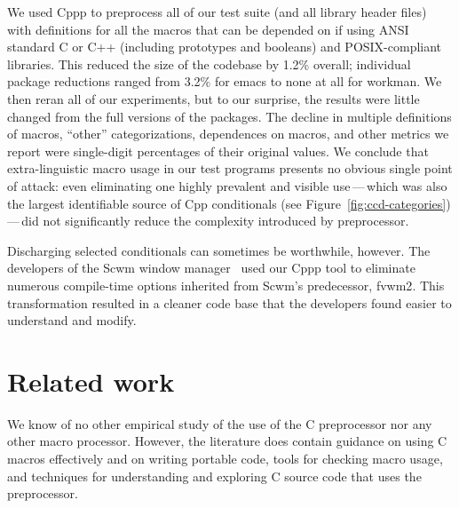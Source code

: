 \documentclass[10pt]{article}
\newcommand{\comment}[1]{\textbf{[[#1]]}}
\newcommand{\pkg}[1]{\textsf{#1}}
\begin{document}



We used Cppp to preprocess all of our test suite (and all library header
files) with definitions for all the macros that can be depended on if using
ANSI standard C or C++ (including prototypes and booleans) and
POSIX-compliant libraries.  This reduced the size of the codebase by 1.2\%
overall; individual package reductions ranged from 3.2\% for \pkg{emacs} to
none at all for \pkg{workman}.  We then reran all of our experiments, but
to our surprise, the results were little changed from the full versions of
the packages.  The decline in multiple definitions of macros, ``other''
categorizations, dependences on macros, and other metrics we report were
single-digit percentages of their original values.  We conclude that
extra-linguistic macro usage in our test programs presents no obvious
single point of attack:  even eliminating one highly prevalent and visible
use\,---\,which was also the largest identifiable source of Cpp
conditionals (see Figure~\ref{fig:ccd-categories})\,---\,did not
significantly reduce the complexity introduced by preprocessor.

Discharging selected conditionals can sometimes be worthwhile, however.
The developers of the \pkg{Scwm} window manager~\cite{Scwm} used our Cppp tool to eliminate
numerous compile-time options inherited from \pkg{Scwm}'s predecessor,
\pkg{fvwm2}.  This transformation resulted in a cleaner code base that the
developers found easier to understand and modify.



\section{Related work}
\label{sec:related}

We know of no other empirical study of the use of the C preprocessor nor
any other macro processor.  However, the literature does contain guidance on
using C macros effectively and on writing portable code, tools for checking macro usage, and techniques
for understanding and exploring C source code that uses the preprocessor.
\end{document}
